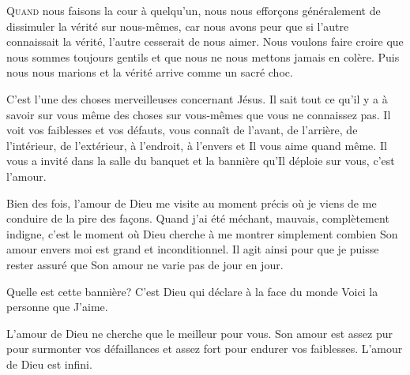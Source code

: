 \dvrule






\lettrine{Q}{uand} nous faisons la cour à quelqu'un,
 nous nous effor\c{c}ons généralement de dissimuler la vérité sur nous-mêmes,
 car nous avons peur que si l'autre connaissait la vérité,
 l'autre cesserait de nous aimer.
 Nous voulons faire croire que nous sommes toujours gentils
 et que nous ne nous mettons jamais en colère.
 Puis nous nous marions et la vérité arrive comme un sacré choc. 

C'est l'une des choses merveilleuses concernant Jésus.
 Il sait tout ce qu'il y a à savoir sur vous
 \ocadr même des choses sur vous-mêmes que vous ne connaissez pas.
 Il voit vos faiblesses et vos défauts, vous connaît de l'avant,
 de l'arrière, de l'intérieur, de l'extérieur, à l'endroit,
 à l'envers et Il vous aime quand même.
 Il vous a invité dans la salle du banquet et la bannière
 qu'Il déploie sur vous, c'est l'amour.

Bien des fois, l'amour de Dieu me visite au moment précis
 où je viens de me conduire de la pire des fa\c{c}ons.
 Quand j'ai été méchant, mauvais, complètement indigne,
 c'est le moment où Dieu cherche à me montrer simplement
 combien Son amour envers moi est grand et inconditionnel.
 Il agit ainsi pour que je puisse rester assuré que Son amour
 ne varie pas de jour en jour. 

Quelle est cette bannière?
 C'est Dieu qui déclare à la face du monde\frcolon{} 
 \Og Voici la personne que J'aime. \Fg{}



L'amour de Dieu ne cherche que le meilleur pour vous.
 Son amour est assez pur pour surmonter vos défaillances
 et assez fort pour endurer vos faiblesses.
 L'amour de Dieu est infini. 

\dvrule

